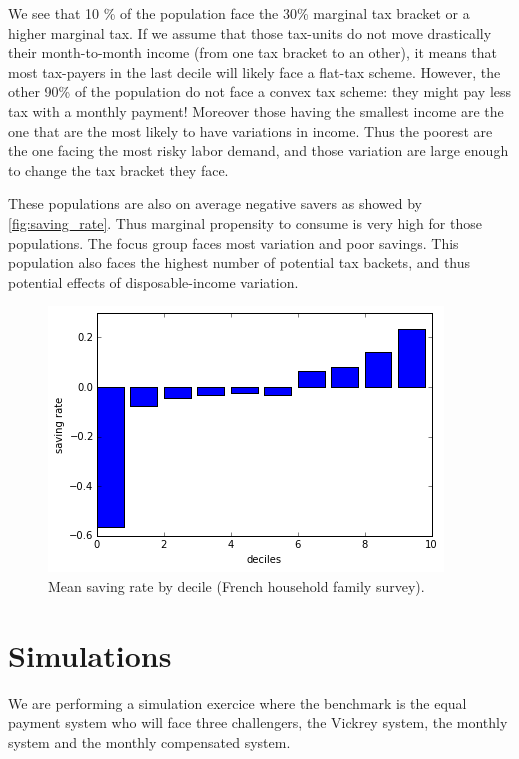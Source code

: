 We see that 10 \% of the population face the 30\% marginal tax bracket or a
higher marginal tax. If we assume that those tax-units do not move drastically
their month-to-month income (from one tax bracket to an other), it means that
most tax-payers in the last decile will likely face a flat-tax scheme.
However, the other 90\% of the population do not face a convex tax scheme:
they might pay less tax with a monthly payment! Moreover those having the
smallest income are the one that are the most likely to have variations in
income. Thus the poorest are the one facing the most risky labor demand, and
those variation are large enough to change the tax bracket they face.

These populations are also on average negative savers as showed by
\autoref{fig:saving_rate}. Thus marginal propensity to consume is very high
for those populations. The focus group faces most variation and poor savings.
This population also faces the highest number of potential tax backets, and
thus potential effects of disposable-income variation.

\begin{figure}
\caption{Mean saving rate by decile (French household family survey).}%
\label{fig:saving_rate}
\begin{center}
\includegraphics[width=\textwidth]{mean_saving_rate_by_decile.png}
\end{center}
\end{figure}

\section{Simulations}

We are performing a simulation exercice where the benchmark is the equal
payment system who will face three challengers, the Vickrey system, the
monthly system and the monthly compensated system.\ 


